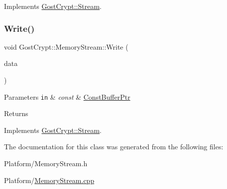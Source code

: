 Implements \hyperlink{class_gost_crypt_1_1_stream}{Gost\+Crypt\+::\+Stream}.

\mbox{\label{class_gost_crypt_1_1_memory_stream_a5dca009f45e062287cae775a0b2e4bff}} 
\subsubsection{\texorpdfstring{Write()}{Write()}}
{\footnotesize\ttfamily void Gost\+Crypt\+::\+Memory\+Stream\+::\+Write (\begin{DoxyParamCaption}\item[{const \hyperlink{class_gost_crypt_1_1_const_buffer_ptr}{Const\+Buffer\+Ptr} \&}]{data }\end{DoxyParamCaption})\hspace{0.3cm}{\ttfamily [virtual]}}


\begin{DoxyParams}[1]{Parameters}
\mbox{\tt in}  & {\em const} & \hyperlink{class_gost_crypt_1_1_const_buffer_ptr}{Const\+Buffer\+Ptr} \\
\hline
\end{DoxyParams}
\begin{DoxyReturn}{Returns}

\end{DoxyReturn}


Implements \hyperlink{class_gost_crypt_1_1_stream}{Gost\+Crypt\+::\+Stream}.



The documentation for this class was generated from the following files\+:\begin{DoxyCompactItemize}
\item 
Platform/Memory\+Stream.\+h\item 
Platform/\hyperlink{_memory_stream_8cpp}{Memory\+Stream.\+cpp}\end{DoxyCompactItemize}
